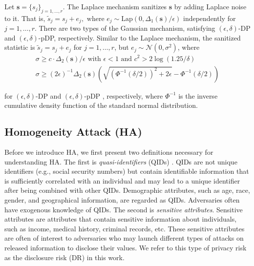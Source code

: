 \documentclass[10pt,journal,compsoc]{IEEEtran}
\newcommand{\s}{\mathbf{s}}
\begin{document}
Let $\s=\{s_j\}_{j=1,\ldots,r}$. The Laplace mechanism \citep{dwork2006calibrating} sanitizes $\s$ by adding  Laplace noise to it. That is, $\tilde{s}_j\!=\!s_j\!+\!e_j,\mbox{ where }e_j\!\sim\!\mbox{Lap}(0,\Delta_1(\s)/\epsilon)$
independently for $j\!=\!1,\ldots,r$. There are two types of the  Gaussian mechanism, satisfying $(\epsilon,\delta)$-DP and $(\epsilon,\delta)$-pDP, respectively. Similar to the Laplace mechanism, the sanitized statistic is $\tilde{s}_j\!=\!s_j\!+\!e_j$ for $j\!=\!1,\ldots,r$, but $e_j\!\sim\! \mathcal{N}(0,\sigma^2)$, where 
\begin{align}
\sigma \geq c\cdot\Delta_2(\s)/ \epsilon \mbox{ with $\epsilon<1$ and  $c^2>2\log(1.25/\delta)$} \label{eqn:gaussian}\\
\sigma\geq (2\epsilon)^{-1} \Delta_2(\s)\left(\sqrt{(\Phi^{-1}(\delta/2))^2+2\epsilon }-\Phi^{-1}(\delta/2)\right)\label{eqn:gaussianp}
\end{align}  \vspace{-12pt}

for $(\epsilon,\delta)$-DP \citep{dwork2014algorithmic} and $(\epsilon,\delta)$-pDP \citep{liu2018generalized}, respectively,
where $\Phi^{-1}$ is the inverse cumulative density function of the standard normal distribution.


\vspace{-12pt}
\subsection{Homogeneity Attack (HA)}\vspace{-3pt}
Before we introduce HA, we first present two definitions necessary for understanding HA. The first is \emph{quasi-identifiers}  (QIDs) \citep{dalenius1986finding}.  QIDs are not unique identifiers (e.g., social security numbers) but contain identifiable information that is sufficiently correlated with an individual and may lead to a unique identifier after being combined with other QIDs. Demographic attributes, such as age, race, gender, and geographical information, are  regarded as QIDs.  Adversaries often have exogenous knowledge of QIDs. The second is \emph{sensitive attributes}.  Sensitive attributes are attributes that contain sensitive information about individuals, such as income, medical history, criminal records, etc. These sensitive attributes are often of interest to adversaries who may launch different types of attacks on released information to disclose their values. We refer to this type of privacy risk as the disclosure risk (DR)  in this work. 
\end{document}
